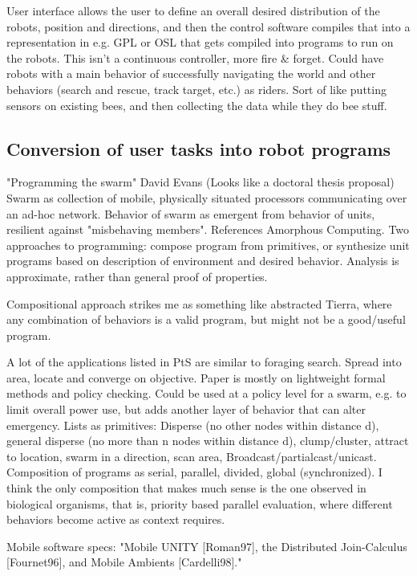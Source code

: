 \documentclass[]{article}
\begin{document}
User interface allows the user to define an overall desired distribution of the robots, position and directions, and then the control software compiles that into a representation in e.g. GPL or OSL that gets compiled into programs to run on the robots. This isn't a continuous controller, more fire \& forget. Could have robots with a main behavior of successfully navigating the world and other behaviors (search and rescue, track target, etc.) as riders. Sort of like putting sensors on existing bees, and then collecting the data while they do bee stuff. 

\subsection{Conversion of user tasks into robot programs}

"Programming the swarm" \cite{evans2000programming} David Evans (Looks like a doctoral thesis proposal) Swarm as collection of mobile, physically situated processors communicating over an ad-hoc network. Behavior of swarm as emergent from behavior of units, resilient against "misbehaving members". References Amorphous Computing. Two approaches to programming: compose program from primitives, or synthesize unit programs based on description of environment and desired behavior. Analysis is approximate, rather than general proof of properties.

Compositional approach strikes me as something like abstracted Tierra, where any combination of behaviors is a valid program, but might not be a good/useful program. 

A lot of the applications listed in PtS are similar to foraging search. Spread into area, locate and converge on objective. Paper is mostly on lightweight formal methods and policy checking. Could be used at a policy level for a swarm, e.g. to limit overall power use, but adds another layer of behavior that can alter emergency. Lists as primitives: Disperse (no other nodes within distance d), general disperse (no more than n nodes within distance d), clump/cluster, attract to location, swarm in a direction, scan area, Broadcast/partialcast/unicast. Composition of programs as serial, parallel, divided, global (synchronized). I think the only composition that makes much sense is the one observed in biological organisms, that is, priority based parallel evaluation, where different behaviors become active as context requires. 

Mobile software specs: "Mobile UNITY [Roman97], the Distributed Join-Calculus [Fournet96], and Mobile Ambients [Cardelli98]."
\end{document}

